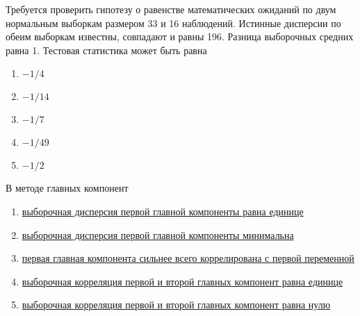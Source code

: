 \documentclass[t]{beamer}
\begin{document}
 \begin{frame} \label{10} 
\begin{block}{10} 

  Требуется проверить гипотезу о равенстве математических ожиданий по двум нормальным выборкам размером 33 и 16 наблюдений. Истинные дисперсии по обеим выборкам известны, совпадают и равны 196. Разница выборочных средних равна 1. Тестовая статистика может быть равна


 \end{block} 
\begin{enumerate} 
\item[] \hyperlink{10-No}{\beamergotobutton{} $-1/4$}
\item[] \hyperlink{10-No}{\beamergotobutton{} $-1/14$}
\item[] \hyperlink{10-No}{\beamergotobutton{} $-1/7$}
\item[] \hyperlink{10-No}{\beamergotobutton{} $-1/49$}
\item[] \hyperlink{10-Yes}{\beamergotobutton{} $-1/2$}
\end{enumerate} 
\end{frame} 


 \begin{frame} \label{11} 
\begin{block}{11} 

  В методе главных компонент


 \end{block} 
\begin{enumerate} 
\item[] \hyperlink{11-No}{\beamergotobutton{} выборочная дисперсия первой главной компоненты равна единице }
\item[] \hyperlink{11-No}{\beamergotobutton{} выборочная дисперсия первой главной компоненты минимальна}
\item[] \hyperlink{11-No}{\beamergotobutton{} первая главная компонента сильнее всего коррелирована с первой переменной}
\item[] \hyperlink{11-No}{\beamergotobutton{} выборочная корреляция первой и второй главных компонент равна единице}
\item[] \hyperlink{11-Yes}{\beamergotobutton{} выборочная корреляция первой и второй главных компонент равна нулю}
\end{enumerate} 
\end{frame} 
\end{document}
